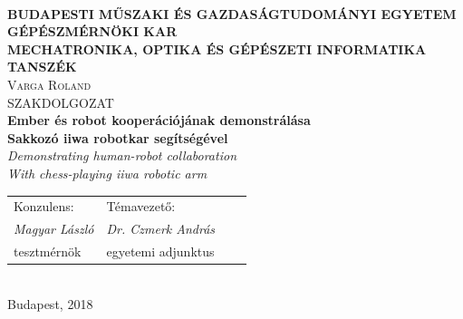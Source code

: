 \documentclass[12pt,a4paper,twoside]{article}
\begin{document}
\begin{titlepage} %
\centering
{}\\[1ex]
{\bf BUDAPESTI MŰSZAKI ÉS GAZDASÁGTUDOMÁNYI EGYETEM}\\
{\bf GÉPÉSZMÉRNÖKI KAR}\\
{\bf MECHATRONIKA, OPTIKA ÉS GÉPÉSZETI INFORMATIKA TANSZÉK}\\[3cm]

{\LARGE \scshape Varga Roland}\\[2ex]
{\Large SZAKDOLGOZAT}\\[2ex]
{\Large \bf Ember és robot kooperációjának demonstrálása\\
		Sakkozó iiwa robotkar segítségével}\\[2ex]
{\itshape Demonstrating human-robot collaboration\\
				With chess-playing iiwa robotic arm}\\[5cm]

\begin{tabularx}{\textwidth}{XXXX}
Konzulens: & Témavezető: \\
\hspace{0.75cm} \itshape Magyar László & \hspace{0.75cm} \itshape Dr. Czmerk András \\
\hspace{0.75cm} tesztmérnök & \hspace{0.75cm} egyetemi adjunktus \\
\end{tabularx}\\[4cm]

{\Large Budapest, 2018}
\end{titlepage}



\newpage\null\thispagestyle{empty}
\newpage\pagestyle{empty}
\setcounter{page}{1}
\tableofcontents

\clearpage
\thispagestyle{empty}

\end{document}

